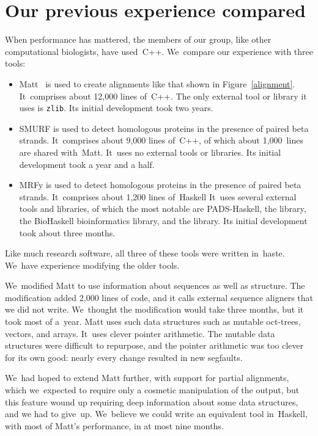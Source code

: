 \documentclass[preprint,nonatbib,blockstyle,nocopyrightspace,times]{sigplanconf}
\newcommand\figref[1]{Figure~\ref{#1}}
\newcommand\seclabel[1]{\label{sec:#1}}
\let\cite\citep
\begin{document}
 
 
\section{Our previous experience compared}
\seclabel{comparo}

When performance has mattered, the members of our group, like other
computational biologists, have used~C++.
We~compare our experience with three tools:
\begin{itemize}
\item
Matt~\cite{Menke:2008wu} is used to create alignments like that shown
in \figref{alignment}.
It~comprises about 12,000 lines of~C++.
The only external tool or library it uses is \texttt{zlib}.
Its initial development took two years.
\item
SMURF
\cite{Menke:2010ti} is used to detect homologous proteins in the presence
of paired beta strands.
It~comprises about 9,000 lines of~C++, of which about 1,000~lines are
shared with~Matt.
It~uses no external tools or libraries.
Its initial development took a year and a half.
\item
MRFy is used to detect homologous proteins in the presence of paired
beta strands.
It~comprises about 1,200 lines of~Haskell
It~uses several external tools and libraries, of which the most
notable are PADS-Haskell, the  library,
the BioHaskell bioinformatics library, and the  library.
Its initial development took about three months.
\end{itemize}
Like much research software, all three of these tools were written
 in~haste.
We~have experience modifying the older tools.



We~modified Matt to use information about sequences as well as structure.
The modification added 2,000 lines of code, and it calls
external sequence aligners that we did not write.
We~thought the modification would take three months, 
but it took most of a~year.
Matt uses such
data structures such as mutable oct-trees, vectors, and arrays.
It~uses clever pointer arithmetic.
The mutable data structures were difficult to 
repurpose, and the pointer arithmetic was too clever for its own good: 
nearly every change resulted in new segfaults.

We~had hoped to extend Matt further, with support for partial alignments,
which we~expected to require only 
a cosmetic manipulation of the 
output, but
this feature wound up
 requiring deep information about some data structures,
and we had to give~up.
We~believe we could write an equivalent tool in~Haskell,
with most of Matt's performance, in at most nine months.
\end{document}
